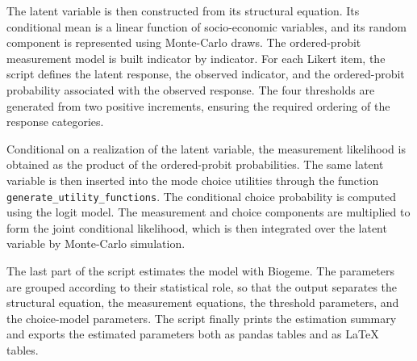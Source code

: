 \documentclass[12pt,a4paper]{article}
\let\OrigUnderscore\_
\def\_{\OrigUnderscore\penalty0\hspace{0pt}}%
\begin{document}
The latent variable is then constructed from its structural equation.
Its conditional mean is a linear function of socio-economic variables,
and its random component is represented using Monte-Carlo draws. The
ordered-probit measurement model is built indicator by indicator. For
each Likert item, the script defines the latent response, the observed
indicator, and the ordered-probit probability associated with the
observed response. The four thresholds are generated from two positive
increments, ensuring the required ordering of the response categories.

Conditional on a realization of the latent variable, the measurement
likelihood is obtained as the product of the ordered-probit
probabilities. The same latent variable is then inserted into the mode
choice utilities through the function
\texttt{generate\_utility\_functions}. The conditional choice
probability is computed using the logit model. The measurement and
choice components are multiplied to form the joint conditional
likelihood, which is then integrated over the latent variable by
Monte-Carlo simulation.

The last part of the script estimates the model with Biogeme. The
parameters are grouped according to their statistical role, so that
the output separates the structural equation, the measurement
equations, the threshold parameters, and the choice-model parameters.
The script finally prints the estimation summary and exports the
estimated parameters both as pandas tables and as \LaTeX{} tables.



\clearpage


\end{document}
